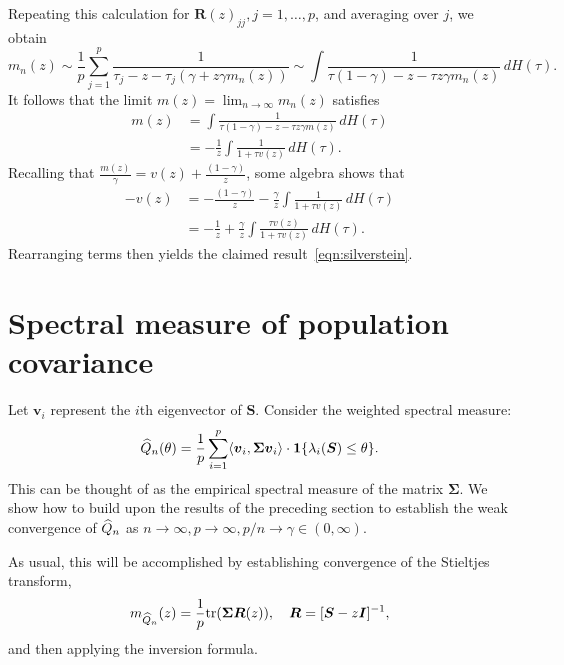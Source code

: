 \documentclass{article}
\newcommand{\bv}{\boldsymbol{v}}
\newcommand{\bSigma}{\boldsymbol{\Sigma}}
\newcommand{\bS}{\boldsymbol{S}}
\newcommand{\bR}{\boldsymbol{R}}
\newcommand{\bI}{\boldsymbol{I}}
\begin{document}
Repeating this calculation for $\bR(z)_{jj}, j = 1,\ldots,p$, and averaging over $j$, we obtain
\begin{equation*}
	m_n(z) \sim \frac{1}{p} \sum_{j = 1}^{p} \frac{1}{\tau_j - z - \tau_j( \gamma + z \gamma m_n(z))} \sim \int \frac{1}{\tau(1 - \gamma) - z - \tau z \gamma m_n(z)} \,dH(\tau).
\end{equation*}
It follows that the limit $m(z) = \lim_{n \to \infty} m_n(z)$ satisfies
\begin{align}
	m(z) 
	& = \int \frac{1}{\tau(1 - \gamma) - z - \tau z \gamma m(z)} \,dH(\tau) \\ 
	& = -\frac{1}{z} \int \frac{1}{1 + \tau v(z)} \,dH(\tau).
\end{align}
Recalling that $\frac{m(z)}{\gamma} = v(z) + \frac{(1 - \gamma)}{z}$, some algebra shows that
\begin{align*}
	-v(z) 
	& = -\frac{(1 - \gamma)}{z} -\frac{\gamma}{z} \int \frac{1}{1 + \tau v(z)} \,dH(\tau) \\
	& = -\frac{1}{z} + \frac{\gamma}{z} \int \frac{\tau v(z)}{1 + \tau v(z)} \,dH(\tau).
\end{align*}
Rearranging terms then yields the claimed result~\eqref{eqn:silverstein}.


\section{Spectral measure of population covariance}
\label{sec:spectral-measure-population-covariance}
Let $\bv_i$ represent the $i$th eigenvector of $\bS$. Consider the weighted spectral measure:
$$
\wh{Q}_n(\theta) = \frac{1}{p} \sum_{i = 1}^{p} \dotp{\bv_i}{\bSigma \bv_i} \cdot \1\{\lambda_i(\bS) \leq \theta\}.
$$
This can be thought of as the empirical spectral measure of the matrix $\bSigma$.
We show how to build upon the results of the preceding section to establish the weak convergence of $\widehat{Q}_n$ as $n \to \infty, p \to \infty, p/n \to \gamma \in (0,\infty)$. 

As usual, this will be accomplished by establishing convergence of the Stieltjes transform, 
\begin{equation}
	\label{eqn:esd-of-covariance}
	m_{\wh{Q}_n}(z) = \frac{1}{p}\tr(\bSigma \bR(z)), \quad \bR = [\bS - z \bI]^{-1},
\end{equation}
and then applying the inversion formula.
\end{document}
